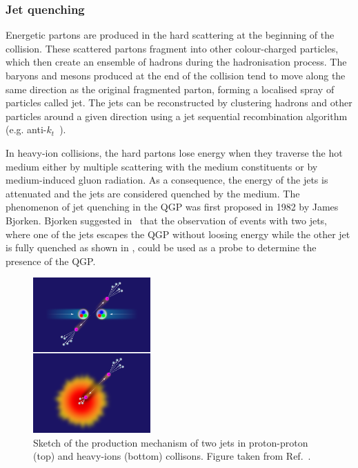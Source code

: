 \subsubsection{Jet quenching}\label{sec:Physics_HI_Probes_JetQuenching}

Energetic partons are produced in the hard scattering at the beginning of the collision. These scattered partons fragment into other colour-charged particles, which then create an ensemble of hadrons during the hadronisation process. The baryons and mesons produced at the end of the collision tend to move along the same direction as the original fragmented parton, forming a localised spray of particles called jet. The jets can be reconstructed by clustering hadrons and other particles around a given direction using a jet sequential recombination algorithm (e.g. anti-$k_{t}$~\cite{AntikT}).

In heavy-ion collisions, the hard partons lose energy when they traverse the hot medium either by multiple scattering with the medium constituents or by medium-induced gluon radiation. As a consequence, the energy of the jets is attenuated and the jets are considered quenched by the medium. The phenomenon of jet quenching in the QGP was first proposed in 1982 by James Bjorken. Bjorken suggested in~\cite{BjorkenJetQuenching} that the observation of events with two jets, where one of the jets escapes the QGP without loosing energy while the other jet is fully quenched as shown in , could be used as a probe to determine the presence of the QGP.

\begin{figure}[!htb]
 \centering
 \includegraphics[width=0.4\textwidth]{Figures/Introduction/HeavyIons/JetQuenching.png}
 \caption{Sketch of the production mechanism of two jets in proton-proton (top) and heavy-ions (bottom) collisons. Figure taken from Ref.~\cite{FigureJetQuenching}.}
 \label{fig:JetQuenching}
\end{figure}

